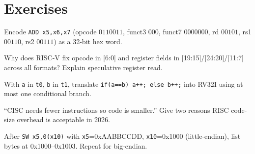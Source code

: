 \section{Exercises}
\begin{exercise}Encode \texttt{ADD x5,x6,x7} (opcode $0110011$, funct3 $000$, funct7 $0000000$, rd $00101$, rs1 $00110$, rs2 $00111$) as a 32-bit hex word.\end{exercise}
\begin{exercise}Why does RISC-V fix opcode in [6:0] and register fields in [19:15]/[24:20]/[11:7] across all formats? Explain speculative register read.\end{exercise}
\begin{exercise}With \texttt{a} in \texttt{t0}, \texttt{b} in \texttt{t1}, translate \texttt{if(a==b) a++; else b++;} into RV32I using at most one conditional branch.\end{exercise}
\begin{exercise}``CISC needs fewer instructions so code is smaller.'' Give two reasons RISC code-size overhead is acceptable in 2026.\end{exercise}
\begin{exercise}After \texttt{SW x5,0(x10)} with \texttt{x5}=0xAABBCCDD, \texttt{x10}=0x1000 (little-endian), list bytes at 0x1000--0x1003. Repeat for big-endian.\end{exercise}
